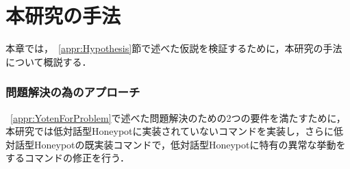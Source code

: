 \chapter{本研究の手法}
\label{meth}

本章では，~\ref{appr:Hypothesis}節で述べた仮説を検証するために，本研究の手法について概説する．

\subsection{問題解決の為のアプローチ}
\label{meth:appr2}
 ~\ref{appr:YotenForProblem}で述べた問題解決のための2つの要件を満たすために，本研究では低対話型Honeypotに実装されていないコマンドを実装し，さらに低対話型Honeypotの既実装コマンドで，低対話型Honeypotに特有の異常な挙動をするコマンドの修正を行う．


%



